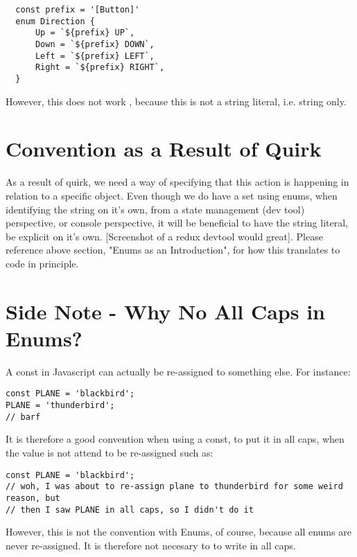 \begin{lstlisting}
  const prefix = '[Button]'
  enum Direction {
      Up = `${prefix} UP`,
      Down = `${prefix} DOWN`,
      Left = `${prefix} LEFT`,
      Right = `${prefix} RIGHT`,
  }
\end{lstlisting}

However, this does not work , because this is not a string literal, i.e. string
only.

\section{ Convention as a Result of Quirk }
As a result of quirk, we need a way of specifying that this action is happening
in relation to a specific object. Even though we do have a set using enums,
when identifying the string on it's own, from a state management (dev tool)
perspective, or console perspective, it will be beneficial to have the string
literal, be explicit on it's own. [Screenshot of a redux devtool would great].
Please reference above section, "Enums as an Introduction", for how this
translates to code in principle.

\section{ Side Note - Why No All Caps in Enums? }
A const in Javascript can actually be re-assigned to something else. For
instance:
\begin{lstlisting}
const PLANE = 'blackbird';
PLANE = 'thunderbird';
// barf
\end{lstlisting}
It is therefore a good convention when using a const, to put it in all caps,
when the value is not attend to be re-assigned such as:
\begin{lstlisting}
const PLANE = 'blackbird';
// woh, I was about to re-assign plane to thunderbird for some weird reason, but
// then I saw PLANE in all caps, so I didn't do it
\end{lstlisting}

However, this is not the convention with Enums, of course, because all enums
are never re-assigned. It is therefore not necesary to to write in all caps.
